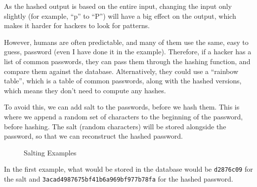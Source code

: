 \documentclass[12pt]{report}
\begin{document}
As the hashed output is based on the entire input, changing the input only slightly (for example, ``p'' to ``P'') will have a big effect on the output, which makes it harder for hackers to look for patterns.

However, humans are often predictable, and many of them use the same, easy to guess, password (even I have done it in the example). Therefore, if a hacker has a list of common passwords, they can pass them through the hashing function, and compare them against the database. Alternatively, they could use a ``rainbow table'', which is a table of common passwords, along with the hashed versions, which means they don't need to compute any hashes. 

To avoid this, we can add salt to the passwords, before we hash them. This is where we append a random set of characters to the beginning of the password, before hashing. The salt (random characters) will be stored alongside the password, so that we can reconstruct the hashed password.

\begin{figure}[H]
\centering
{}
\caption{Salting Examples}
\end{figure}

In the first example, what would be stored in the database would be \texttt{d2876c09} for the salt and \texttt{3acad4987675bf41b6a969bf977b78fa} for the hashed password.
\end{document}

